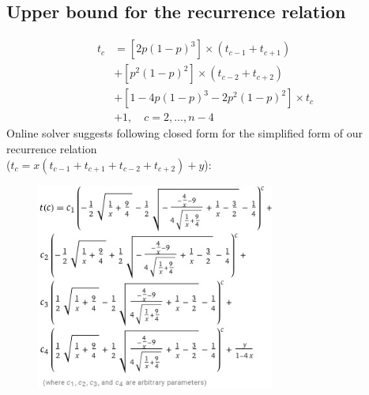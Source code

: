 \documentclass[]{book}
\theoremstyle{definition}
\begin{document}
\subsection{Upper bound for the recurrence relation}
\begin{equation}
\begin{split}
    t_c &= \left[2p\left(1-p\right)^3\right] \times \left( t_{c-1}+t_{c+1} \right) \\
    &+ \left[p^2\left(1-p\right)^2\right] \times \left( t_{c-2}+t_{c+2} \right) \\
    &+ \left[1-4p\left(1-p\right)^3-2p^2\left(1-p\right)^2\right] \times t_c \\
    &+ 1,  \quad c = 2,\ldots,n-4
\end{split}
\end{equation}
Online solver suggests following closed form for the simplified form of our recurrence relation \\ ($t_c = x\left( t_{c-1} + t_{c+1} + t_{c-2} + t_{c+2} \right) + y$):
\begin{figure}[H]
    \centering
    \includegraphics[width=0.7\textwidth]{figures/lower_bound.jpg}
    \caption{}
\end{figure}
\end{document}
